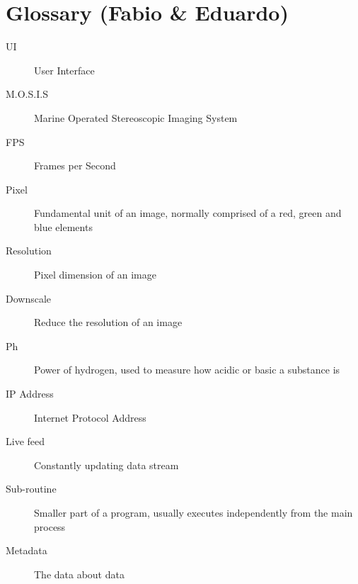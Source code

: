 \section{Glossary (Fabio \& Eduardo)}
\begin{description}
	\item[UI] User Interface
	\item[M.O.S.I.S] Marine Operated Stereoscopic Imaging System
	\item[FPS] Frames per Second
	\item[Pixel] Fundamental unit of an image, normally comprised of a red, green and blue elements
	\item[Resolution] Pixel dimension of an image
	\item[Downscale] Reduce the resolution of an image
	\item[Ph] Power of hydrogen, used to measure how acidic or basic a substance is
	\item[IP Address] Internet Protocol Address
	\item[Live feed] Constantly updating data stream
	\item[Sub-routine] Smaller part of a program, usually executes independently from the main process
	\item[Metadata] The data about data
\end{description}